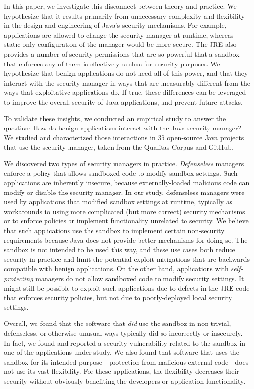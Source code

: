 \documentclass{sig-alternate}
\begin{document}
In this paper, we investigate this disconnect between theory and practice. We
hypothesize that it results primarily from unnecessary complexity and flexibility
in the design and engineering of Java's security mechanisms. For example,
applications are allowed to change the security manager at runtime, whereas
static-only configuration of the manager would be more secure. The JRE also
provides a number of security permissions that are so powerful that a sandbox
that enforces any of them is effectively useless for security purposes. We
hypothesize that benign applications do not need all of this power, and that
they interact with the security manager in ways
that are measurably different from the ways that exploitative applications do.
If true, these differences can be leveraged to improve the overall security of
Java applications, and prevent future attacks.


To validate these insights, we conducted an empirical study
to answer the question: How do benign
applications interact with the Java security manager? We studied and
characterized those interactions in 36
open-source Java projects that use the security manager, taken from the Qualitas
Corpus \cite{QualitasCorpus:APSEC:2010} and GitHub.


We discovered two types of security managers in
practice. \emph{Defenseless} managers enforce a policy that allows sandboxed code
to modify sandbox settings. Such applications
are inherently insecure, because externally-loaded malicious code can
modify or disable the security manager. In our study, defenseless managers were
used by applications that modified sandbox settings at runtime, typically
as workarounds to using more complicated (but more correct) security mechanisms
or to enforce policies or implement functionality
unrelated to security. We believe that such applications use the
sandbox to implement certain non-security requirements
because Java does not provide better mechanisms for doing so.
The sandbox is not intended to be used this way, and these use cases
both reduce security in practice and limit the potential exploit mitigations that are
backwards compatible with benign applications.
On the other hand, applications with \emph{self-protecting} managers do
not allow sandboxed code to modify security settings.
It might still be possible to exploit
such applications due to defects in the JRE code that enforces security
policies, but not due to poorly-deployed local security settings.


Overall, we found that the software that \emph{did} use the sandbox in
non-trivial, defenseless, or otherwise
unusual ways typically did so incorrectly or insecurely. In fact, we found and reported a
security vulnerability related to the sandbox in one of the applications under study. We also found that
software that uses the sandbox for its intended
purpose---protection from malicious external code---does not use its
vast flexibility. For these applications, the flexibility decreases their security without
obviously benefiting the developers or application functionality. 
\end{document}
